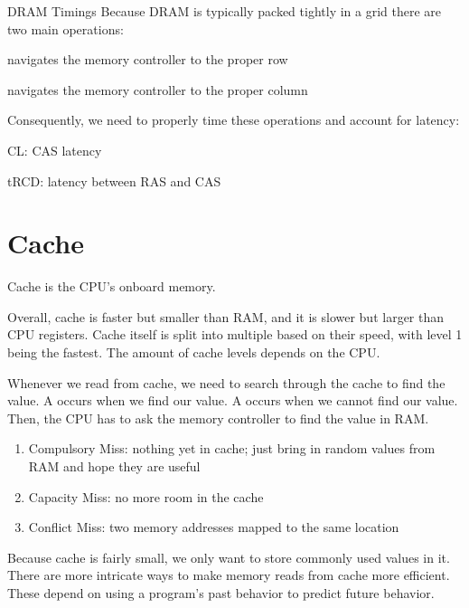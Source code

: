 \documentclass[12pt]{report}
\begin{document}
\begin{genbox}{DRAM Timings}
	Because DRAM is typically packed tightly in a grid there are two main operations:
	\begin{dfnitems}
		\item {} navigates the memory controller to the proper row
		\item {} navigates the memory controller to the proper column 
	\end{dfnitems}
	Consequently, we need to properly time these operations and account for latency:
	\begin{dfnitems}
		\item CL: CAS latency
		\item tRCD: latency between RAS and CAS
	\end{dfnitems}
\end{genbox}

\chapter{Cache}
\begin{dfnbox}{Cache}
	 is the CPU's onboard memory.
\end{dfnbox}

Overall, cache is faster but smaller than RAM, and it is slower but larger than CPU registers. Cache itself is split into multiple  based on their speed, with level 1 being the fastest. The amount of cache levels depends on the CPU.

Whenever we read from cache, we need to search through the cache to find the value. A  occurs when we find our value. A  occurs when we cannot find our value. Then, the CPU has to ask the memory controller to find the value in RAM.

\begin{enumerate}
	\item Compulsory Miss: nothing yet in cache; just bring in random values from RAM and hope they are useful
	\item Capacity Miss: no more room in the cache
	\item Conflict Miss: two memory addresses mapped to the same location
\end{enumerate}

Because cache is fairly small, we only want to store commonly used values in it. There are more intricate ways to make memory reads from cache more efficient. These depend on using a program's past behavior to predict future behavior.
\end{document}
